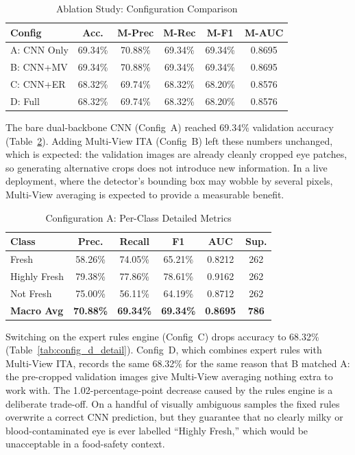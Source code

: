 \documentclass[conference]{IEEEtran}
\begin{document}
\begin{table}[h]
\centering
\caption{Ablation Study: Configuration Comparison}
\label{tab:ablation_results}
\begin{tabular}{lccccc}
\toprule
\textbf{Config} & \textbf{Acc.} & \textbf{M-Prec} & \textbf{M-Rec} & \textbf{M-F1} & \textbf{M-AUC} \\
\midrule
A: CNN Only & 69.34\% & 70.88\% & 69.34\% & 69.34\% & 0.8695 \\
B: CNN+MV & 69.34\% & 70.88\% & 69.34\% & 69.34\% & 0.8695 \\
C: CNN+ER & 68.32\% & 69.74\% & 68.32\% & 68.20\% & 0.8576 \\
D: Full & 68.32\% & 69.74\% & 68.32\% & 68.20\% & 0.8576 \\
\bottomrule
\end{tabular}
\end{table}

The bare dual-backbone CNN (Config~A) reached 69.34\% validation accuracy (Table~\ref{tab:config_a_detail}). Adding Multi-View ITA (Config~B) left these numbers unchanged, which is expected: the validation images are already cleanly cropped eye patches, so generating alternative crops does not introduce new information. In a live deployment, where the detector's bounding box may wobble by several pixels, Multi-View averaging is expected to provide a measurable benefit.

\begin{table}[h]
\centering
\caption{Configuration A: Per-Class Detailed Metrics}
\label{tab:config_a_detail}
\begin{tabular}{lccccc}
\toprule
\textbf{Class} & \textbf{Prec.} & \textbf{Recall} & \textbf{F1} & \textbf{AUC} & \textbf{Sup.} \\
\midrule
Fresh & 58.26\% & 74.05\% & 65.21\% & 0.8212 & 262 \\
Highly Fresh & 79.38\% & 77.86\% & 78.61\% & 0.9162 & 262 \\
Not Fresh & 75.00\% & 56.11\% & 64.19\% & 0.8712 & 262 \\
\midrule
\textbf{Macro Avg} & \textbf{70.88\%} & \textbf{69.34\%} & \textbf{69.34\%} & \textbf{0.8695} & \textbf{786} \\
\bottomrule
\end{tabular}
\end{table}

Switching on the expert rules engine (Config~C) drops accuracy to 68.32\% (Table~\ref{tab:config_d_detail}). Config~D, which combines expert rules with Multi-View ITA, records the same 68.32\% for the same reason that B matched A: the pre-cropped validation images give Multi-View averaging nothing extra to work with. The 1.02-percentage-point decrease caused by the rules engine is a deliberate trade-off. On a handful of visually ambiguous samples the fixed rules overwrite a correct CNN prediction, but they guarantee that no clearly milky or blood-contaminated eye is ever labelled ``Highly Fresh,'' which would be unacceptable in a food-safety context.
\end{document}
